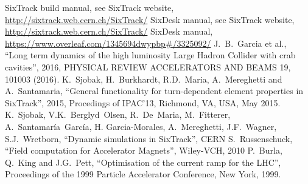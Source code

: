 \begin{thebibliography}{99}
        SixTrack build manual, see SixTrack website, \url{http://sixtrack.web.cern.ch/SixTrack/}
        SixDesk manual, see SixTrack website, \url{http://sixtrack.web.cern.ch/SixTrack/}
        SixDesk manual, \url{https://www.overleaf.com/1345694dwypbp#/3325092/}
        J.~B.~Garcia et al., 
        ``Long term dynamics of the high luminosity Large Hadron Collider with crab cavities'',
        2016, PHYSICAL REVIEW ACCELERATORS AND BEAMS 19, 101003 (2016).
        K.~Sjobak, H.~Burkhardt, R.D.~Maria, A.~Mereghetti and A.~Santamaria,
        ``General functionality for turn-dependent element properties in SixTrack'',
        2015, Procedings of IPAC'13, Richmond, VA, USA, May 2015.
        K.~Sjobak, V.K.~Berglyd~Olsen, R.~De~Maria, M.~Fitterer, A.~Santamaría~García, H. Garcia-Morales, A.~Mereghetti, J.F.~Wagner, S.J.~Wretborn,
        ``Dynamic simulations in SixTrack'',
        CERN
        S.~Russenschuck,
        ``Field computation for Accelerator Magnets'',
        Wiley-VCH, 2010
        P.~Burla, Q.~King and J.G.~Pett,
        ``Optimisation of the current ramp for the LHC'',
        Proceedings of the 1999 Particle Accelerator Conference, New York, 1999.
\end{thebibliography}

